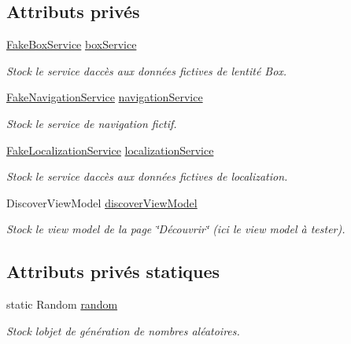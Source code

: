 \subsection*{Attributs privés}
\begin{DoxyCompactItemize}
\item 
\hyperlink{class_boxes_1_1_tests_1_1_mock_1_1_services_1_1_fake_box_service}{Fake\+Box\+Service} \hyperlink{class_boxes_1_1_tests_1_1_discover_view_model_tests_abd187b438b11e8468d0930dd041ebaf8}{box\+Service}
\begin{DoxyCompactList}\small\item\em Stock le service d\textquotesingle{}accès aux données fictives de l\textquotesingle{}entité Box. \end{DoxyCompactList}\item 
\hyperlink{class_boxes_1_1_tests_1_1_mock_1_1_services_1_1_fake_navigation_service}{Fake\+Navigation\+Service} \hyperlink{class_boxes_1_1_tests_1_1_discover_view_model_tests_a6deba16334eacb2749678716199ada87}{navigation\+Service}
\begin{DoxyCompactList}\small\item\em Stock le service de navigation fictif. \end{DoxyCompactList}\item 
\hyperlink{class_boxes_1_1_tests_1_1_mock_1_1_services_1_1_fake_localization_service}{Fake\+Localization\+Service} \hyperlink{class_boxes_1_1_tests_1_1_discover_view_model_tests_afbbaf58853f63f8329c434201c79d9ee}{localization\+Service}
\begin{DoxyCompactList}\small\item\em Stock le service d\textquotesingle{}accès aux données fictives de localization. \end{DoxyCompactList}\item 
Discover\+View\+Model \hyperlink{class_boxes_1_1_tests_1_1_discover_view_model_tests_a42c91316755e354bbe465001344eb2ca}{discover\+View\+Model}
\begin{DoxyCompactList}\small\item\em Stock le view model de la page \char`\"{}\+Découvrir\char`\"{} (ici le view model à tester). \end{DoxyCompactList}\end{DoxyCompactItemize}
\subsection*{Attributs privés statiques}
\begin{DoxyCompactItemize}
\item 
static Random \hyperlink{class_boxes_1_1_tests_1_1_discover_view_model_tests_aa69a807ac10e1bcb4367c75d4e4641c8}{random}
\begin{DoxyCompactList}\small\item\em Stock l\textquotesingle{}objet de génération de nombres aléatoires. \end{DoxyCompactList}\end{DoxyCompactItemize}


